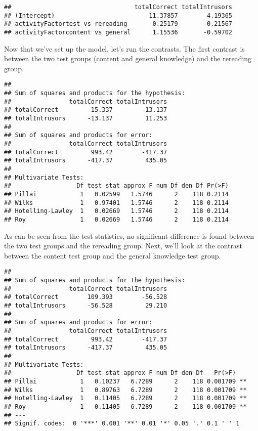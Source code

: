 \documentclass[12pt,]{article}
\begin{document}
\begin{verbatim}
##                                  totalCorrect totalIntrusors
## (Intercept)                          11.37857        4.19365
## activityFactortest vs rereading       0.25179       -0.21567
## activityFactorcontent vs general      1.15536       -0.59702
\end{verbatim}

Now that we've set up the model, let's run the contrasts. The first
contrast is between the two test groups (content and general knowledge)
and the rereading group.

\begin{verbatim}
## 
## Sum of squares and products for the hypothesis:
##                totalCorrect totalIntrusors
## totalCorrect         15.337        -13.137
## totalIntrusors      -13.137         11.253
## 
## Sum of squares and products for error:
##                totalCorrect totalIntrusors
## totalCorrect         993.42        -417.37
## totalIntrusors      -417.37         435.05
## 
## Multivariate Tests: 
##                  Df test stat approx F num Df den Df Pr(>F)
## Pillai            1   0.02599   1.5746      2    118 0.2114
## Wilks             1   0.97401   1.5746      2    118 0.2114
## Hotelling-Lawley  1   0.02669   1.5746      2    118 0.2114
## Roy               1   0.02669   1.5746      2    118 0.2114
\end{verbatim}

As can be seen from the test statistics, no significant difference is
found between the two test groups and the rereading group. Next, we'll
look at the contrast between the content test group and the general
knowledge test group.

\begin{verbatim}
## 
## Sum of squares and products for the hypothesis:
##                totalCorrect totalIntrusors
## totalCorrect        109.393        -56.528
## totalIntrusors      -56.528         29.210
## 
## Sum of squares and products for error:
##                totalCorrect totalIntrusors
## totalCorrect         993.42        -417.37
## totalIntrusors      -417.37         435.05
## 
## Multivariate Tests: 
##                  Df test stat approx F num Df den Df   Pr(>F)   
## Pillai            1   0.10237   6.7289      2    118 0.001709 **
## Wilks             1   0.89763   6.7289      2    118 0.001709 **
## Hotelling-Lawley  1   0.11405   6.7289      2    118 0.001709 **
## Roy               1   0.11405   6.7289      2    118 0.001709 **
## ---
## Signif. codes:  0 '***' 0.001 '**' 0.01 '*' 0.05 '.' 0.1 ' ' 1
\end{verbatim}
\end{document}

